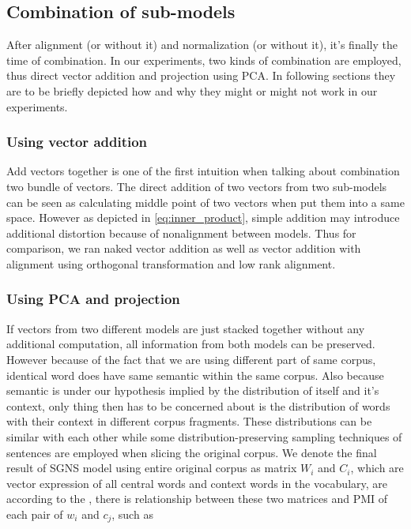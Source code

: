 \subsection{Combination of sub-models}
  After alignment (or without it) and normalization (or without it), it's finally the time of combination. In our experiments, two kinds of combination are employed, thus direct vector addition and projection using PCA. In following sections they are to be briefly depicted how and why they might or might not work in our experiments.

  \subsubsection{Using vector addition}
  Add vectors together is one of the first intuition when talking about combination two bundle of vectors. The direct addition of two vectors from two sub-models can be seen as calculating middle point of two vectors when put them into a same space. However as depicted in \eqref{eq:inner_product}, simple addition may introduce additional distortion because of nonalignment between models. Thus for comparison, we ran naked vector addition as well as vector addition with alignment using orthogonal transformation and low rank alignment.

  \subsubsection{Using PCA and projection}
  If vectors from two different models are just stacked together without any additional computation, all information from both models can be preserved. However because of the fact that we are using different part of same corpus, identical word does have same semantic within the same corpus. Also because semantic is under our hypothesis implied by the distribution of itself and it's context, only thing then has to be concerned about is the distribution of words with their context in different corpus fragments. These distributions can be similar with each other while some distribution-preserving sampling techniques of sentences are employed when slicing the original corpus. We denote the final result of SGNS model using entire original corpus as matrix $W_i$ and $C_i$, which are vector expression of all central words and context words in the vocabulary, are according to the \cite{levy2014neural}, there is relationship between these two matrices and PMI of each pair of $w_i$ and $c_j$, such as

